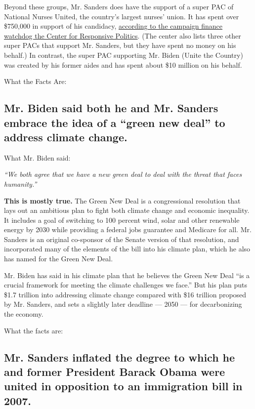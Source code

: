 Beyond these groups, Mr. Sanders does have the support of a super PAC of
National Nurses United, the country's largest nurses' union. It has
spent over \$750,000 in support of his candidacy,
\href{https://www.opensecrets.org/outsidespending/summ.php?chrt=V\&type=S}{according
to the campaign finance watchdog the Center for Responsive Politics}.
(The center also lists three other super PACs that support Mr. Sanders,
but they have spent no money on his behalf.) In contrast, the super PAC
supporting Mr. Biden (Unite the Country) was created by his former aides
and has spent about \$10 million on his behalf.

What the Facts Are:

\hypertarget{mr-biden-said-both-he-and-mr-sanders-embrace-the-idea-of-a-green-new-deal-to-address-climate-change}{%
\subsection{Mr. Biden said both he and Mr. Sanders embrace the idea of a
``green new deal'' to address climate
change.}\label{mr-biden-said-both-he-and-mr-sanders-embrace-the-idea-of-a-green-new-deal-to-address-climate-change}}

What Mr. Biden said:

\emph{``We both agree that we have a new green deal to deal with the
threat that faces humanity.''}

\textbf{This is mostly true.} The Green New Deal is a congressional
resolution that lays out an ambitious plan to fight both climate change
and economic inequality. It includes a goal of switching to 100 percent
wind, solar and other renewable energy by 2030 while providing a federal
jobs guarantee and Medicare for all. Mr. Sanders is an original
co-sponsor of the Senate version of that resolution, and incorporated
many of the elements of the bill into his climate plan, which he also
has named for the Green New Deal.

Mr. Biden has said in his climate plan that he believes the Green New
Deal ``is a crucial framework for meeting the climate challenges we
face.'' But his plan puts \$1.7 trillion into addressing climate change
compared with \$16 trillion proposed by Mr. Sanders, and sets a slightly
later deadline --- 2050 --- for decarbonizing the economy.

What the facts are:

\hypertarget{mr-sanders-inflated-the-degree-to-which-he-and-former-president-barack-obama-were-united-in-opposition-to-an-immigration-bill-in-2007}{%
\subsection{Mr. Sanders inflated the degree to which he and former
President Barack Obama were united in opposition to an immigration bill
in
2007.}\label{mr-sanders-inflated-the-degree-to-which-he-and-former-president-barack-obama-were-united-in-opposition-to-an-immigration-bill-in-2007}}

